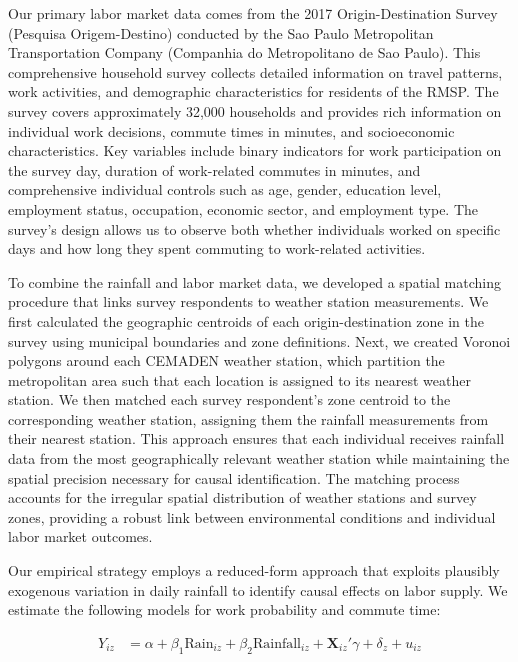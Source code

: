 Our primary labor market data comes from the 2017 Origin-Destination Survey (Pesquisa Origem-Destino) conducted by the Sao Paulo Metropolitan Transportation Company (Companhia do Metropolitano de Sao Paulo). This comprehensive household survey collects detailed information on travel patterns, work activities, and demographic characteristics for residents of the RMSP. The survey covers approximately 32,000 households and provides rich information on individual work decisions, commute times in minutes, and socioeconomic characteristics. Key variables include binary indicators for work participation on the survey day, duration of work-related commutes in minutes, and comprehensive individual controls such as age, gender, education level, employment status, occupation, economic sector, and employment type. The survey's design allows us to observe both whether individuals worked on specific days and how long they spent commuting to work-related activities.

To combine the rainfall and labor market data, we developed a spatial matching procedure that links survey respondents to weather station measurements. We first calculated the geographic centroids of each origin-destination zone in the survey using municipal boundaries and zone definitions. Next, we created Voronoi polygons around each CEMADEN weather station, which partition the metropolitan area such that each location is assigned to its nearest weather station. We then matched each survey respondent's zone centroid to the corresponding weather station, assigning them the rainfall measurements from their nearest station. This approach ensures that each individual receives rainfall data from the most geographically relevant weather station while maintaining the spatial precision necessary for causal identification. The matching process accounts for the irregular spatial distribution of weather stations and survey zones, providing a robust link between environmental conditions and individual labor market outcomes.

Our empirical strategy employs a reduced-form approach that exploits plausibly exogenous variation in daily rainfall to identify causal effects on labor supply. We estimate the following models for work probability and commute time:

\begin{align*}
Y_{iz} &= \alpha + \beta_1 \text{Rain}_{iz} + \beta_2 \text{Rainfall}_{iz} + \mathbf{X}_{iz}'\gamma + \delta_z + u_{iz}
\end{align*}

